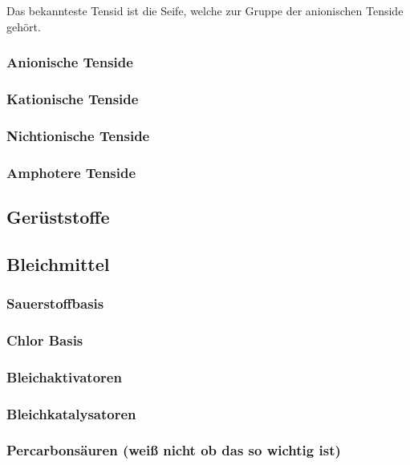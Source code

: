 \documentclass[12pt, ngerman]{article}
\begin{document}
Das bekannteste Tensid ist die Seife, welche zur Gruppe der anionischen Tenside gehört.

\subsubsection{Anionische Tenside}

\subsubsection{Kationische Tenside}

\subsubsection{Nichtionische Tenside}

\subsubsection{Amphotere Tenside}

\subsection{Gerüststoffe}

\subsection{Bleichmittel}

\subsubsection{Sauerstoffbasis}

\subsubsection{Chlor Basis}

\subsubsection{Bleichaktivatoren}

\subsubsection{Bleichkatalysatoren}

\subsubsection{Percarbonsäuren (weiß nicht ob das so wichtig ist)}
\end{document}
